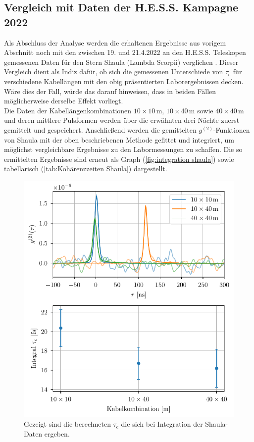\subsection{Vergleich mit Daten der H.E.S.S. Kampagne 2022}
\label{ssec:Vergleich mit Hess}
Als Abschluss der Analyse werden die erhaltenen Ergebnisse aus vorigem Abschnitt noch mit den zwischen 19. und 21.4.2022 an den H.E.S.S. Teleskopen gemessenen Daten für den Stern Shaula (Lambda Scorpii) verglichen \cite{zmijaFirstIntensityInterferometry2023}. 
Dieser Vergleich dient als Indiz dafür, ob sich die gemessenen Unterschiede von $\tau_{\mathrm{c}}$ für verschiedene Kabellängen mit den obig präsentierten Laborergebnissen decken. 
Wäre dies der Fall, würde das darauf hinweisen, dass in beiden Fällen möglicherweise derselbe Effekt vorliegt. \\ 
Die Daten der Kabellängenkombinationen $10 \times 10\,\mathrm{m}$, $10 \times 40\,\mathrm{m}$ sowie $40 \times 40\,\mathrm{m}$ und deren mittlere Pulsformen werden über die erwähnten drei Nächte zuerst gemittelt und gespeichert. 
Anschließend werden die gemittelten $g^{(2)}$-Funktionen von Shaula mit der oben beschriebenen Methode gefittet und integriert, um möglichst vergleichbare Ergebnisse zu den Labormessungen zu schaffen. 
Die so ermittelten Ergebnisse sind erneut als Graph (\autoref{fig:integration shaula}) sowie tabellarisch (\autoref{tab:Kohärenzzeiten Shaula}) dargestellt. 
\begin{figure}[hp]
    \centering
    \includegraphics{images/Analysis/Shaula_combined.pdf}
    \caption{Gezeigt sind die berechneten $\tau_{\mathrm{c}}$ die sich bei Integration der Shaula-Daten ergeben.}
    \label{fig:integration shaula}
\end{figure}
